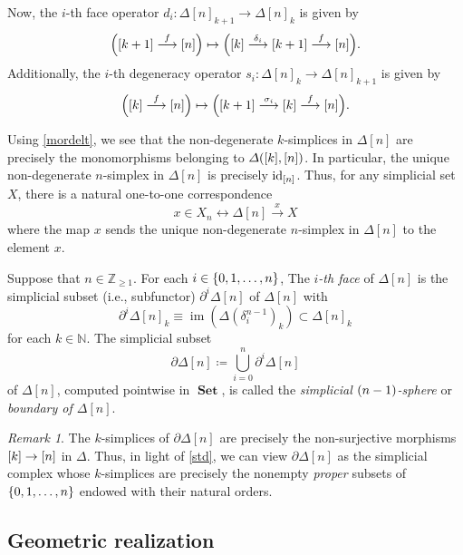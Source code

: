 \documentclass[10pt,letterpaper,cm]{nupset}
\theoremstyle{definition}
\theoremstyle{theorem}
\theoremstyle{remark}
\newtheorem{remark}[definition]{Remark}
\newcommand{\Z}{\mathbb Z}
\DeclareMathOperator{\im}{im}
\newcommand{\0}{\mathbf{0}}
\newcommand{\1}{\mathbf{1}}
\newcommand{\2}{\mathbf{2}}
\DeclareMathOperator{\set}{\mathbf{Set}}
\newcommand{\N}{\mathbb N}
\DeclareMathOperator{\idd}{id}
\begin{document}
Now, the $i$-th face operator $d_i : \Delta[n]_{k+1} \to \Delta[n]_k$ is given by
\[
\mleft(\mleft[k+1\mright] \stackrel{f}{\longrightarrow}\mleft[n\mright]\mright) \mapsto \mleft(\mleft[k\mright] \stackrel{\delta_i}{\longrightarrow}\mleft[k+1\mright] \stackrel{f}{\longrightarrow}\mleft[n\mright]\mright).
\]
Additionally, the $i$-th degeneracy operator $s_i : \Delta[n]_{k} \to \Delta[n]_{k+1}$ is given by 
\[
\mleft(\mleft[k\mright] \stackrel{f}{\longrightarrow}\mleft[n\mright]\mright) \mapsto \mleft(\mleft[k+1\mright] \stackrel{\sigma_i}{\longrightarrow}\mleft[k\mright] \stackrel{f}{\longrightarrow}\mleft[n\mright]\mright).
\] 

Using \cref{mordelt}, we see that the non-degenerate $k$-simplices in $\Delta[n]$ are precisely the monomorphisms belonging to $\varDelta\mleft(\mleft[k\mright], \mleft[n\mright]\mright)$.  In particular, the unique non-degenerate $n$-simplex in $\Delta[n]$ is precisely $\idd_{\mleft[n\mright]}$. Thus, for any simplicial set $X$, there is a natural one-to-one correspondence 
\[
x\in X_n \longleftrightarrow \Delta[n] \overset{x}{\to} X
\] where the map $x$ sends the unique non-degenerate $n$-simplex in $\Delta[n]$ to the element $x$.

\medskip


Suppose that $n\in \Z_{\geq 1}$. For each $i\in \mleft\{0,1, \ldots, n\mright\}$, The \textit{$i$-th face} of $\Delta[n]$ is the simplicial subset (i.e., subfunctor) $\partial^i{\Delta[n]}$ of $\Delta[n]$ with $$\partial^i{\Delta[n]}_k \equiv \im(\Delta(\delta_i^{n-1})_k) \subset \Delta[n]_k$$ for each $k\in \N$. The simplicial subset
\[
\partial{\Delta[n]} \coloneqq \bigcup_{i=0}^n\partial^i{\Delta[n]}
\] of $\Delta[n]$, computed pointwise in $\set$,  is called the \textit{simplicial $\mleft(n-1\mright)$-sphere} or \textit{boundary of $\Delta[n]$}. 

\begin{remark}
The $k$-simplices of $\partial{\Delta[n]}$ are precisely the non-surjective morphisms $\mleft[k\mright]\to \mleft[n\mright]$ in $\varDelta$. Thus, in light of \cref{std}, we can view $\partial{\Delta[n]}$ as the simplicial complex whose $k$-simplices are precisely the nonempty \emph{proper} subsets of $\mleft\{0, 1, \ldots, n\mright\}$ endowed with their natural orders.
\end{remark}

\subsection*{Geometric realization}
\end{document}
